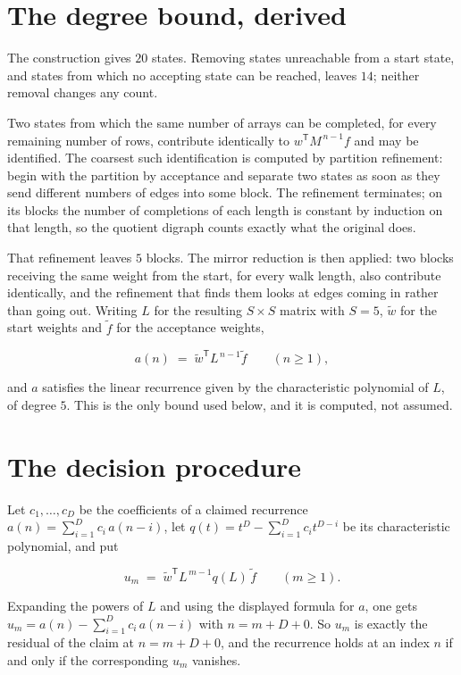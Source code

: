 \documentclass[11pt]{article}
\theoremstyle{definition}
\begin{document}
\section{The degree bound, derived}

The construction gives $20$ states. Removing states unreachable from a start state, and states from which no accepting state can be reached, leaves $14$; neither removal changes any count.

Two states from which the same number of arrays can be completed, for every remaining number of rows, contribute identically to $w^{\mathsf T}M^{\,n-1}f$ and may be identified. The coarsest such identification is computed by partition refinement: begin with the partition by acceptance and separate two states as soon as they send different numbers of edges into some block. The refinement terminates; on its blocks the number of completions of each length is constant by induction on that length, so the quotient digraph counts exactly what the original does.

That refinement leaves $5$ blocks. The mirror reduction is then applied: two blocks receiving the same weight from the start, for every walk length, also contribute identically, and the refinement that finds them looks at edges coming in rather than going out. Writing $L$ for the resulting $S \times S$ matrix with $S = 5$, $\tilde w$ for the start weights and $\tilde f$ for the acceptance weights,

\[a(n) \;=\; \tilde w^{\mathsf T} L^{\,n-1} \tilde f \qquad (n \ge 1),\]

and $a$ satisfies the linear recurrence given by the characteristic polynomial of $L$, of degree $5$. This is the only bound used below, and it is computed, not assumed.

\section{The decision procedure}

Let $c_1,\dots,c_D$ be the coefficients of a claimed recurrence $a(n) = \sum_{i=1}^{D} c_i\,a(n-i)$, let $q(t) = t^{D} - \sum_{i=1}^{D} c_i t^{D-i}$ be its characteristic polynomial, and put

\[u_m \;=\; \tilde w^{\mathsf T} L^{\,m-1} q(L)\,\tilde f \qquad (m \ge 1).\]

Expanding the powers of $L$ and using the displayed formula for $a$, one gets $u_m = a(n) - \sum_{i=1}^{D} c_i\,a(n-i)$ with $n = m + D + 0$. So $u_m$ is exactly the residual of the claim at $n = m + D + 0$, and the recurrence holds at an index $n$ if and only if the corresponding $u_m$ vanishes.
\end{document}
